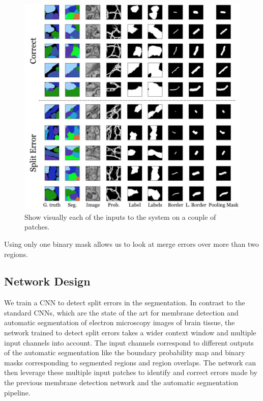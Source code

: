 \begin{figure}[t]
\includegraphics[scale=.15]{gfx/patches_jt.pdf}
\caption{Show visually each of the inputs to the system on a couple of patches.}
\end{figure}

Using only one binary mask allows us to look at merge errors over more than two regions.


\subsection{Network Design}
We train a CNN to detect split errors in the segmentation. In contrast to the standard CNNs, which are the state of the art for membrane detection and automatic segmentation of electron microscopy images of brain tissue, the network trained to detect split errors takes a wider context window and multiple input channels into account. The input channels correspond to different outputs of the automatic segmentation like the boundary probability map and binary masks corresponding to segmented regions and region overlaps. The network can then leverage these multiple input patches to identify and correct errors made by the previous membrane detection network and the automatic segmentation pipeline. 

